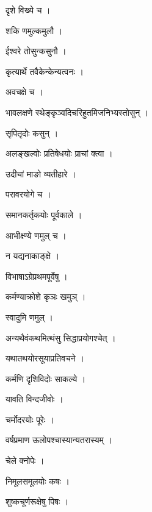 \documentclass[10pt, openany, oneside]{book}
\begin{document}
\noindent दृशे विख्ये च ।

\noindent शकि णमुल्कमुलौ ।

\noindent ईश्वरे तोसुन्कसुनौ ।

\noindent कृत्यार्थे तवैकेन्केन्यत्वनः ।

\noindent अवचक्षे च ।

\noindent भावलक्षणे स्थेङ्कृञ्वदिचरिहुतमिजनिभ्यस्तोसुन् ।

\noindent सृपितृदोः कसुन् ।

\noindent अलङ्खल्वोः प्रतिषेधयोः प्राचां क्त्वा ।

\noindent उदीचां माङो व्यतीहारे ।

\noindent परावरयोगे च ।

\noindent समानकर्तृकयोः पूर्वकाले ।

\noindent आभीक्ष्ण्ये णमुल् च ।

\noindent न यद्यनाकाङ्क्षे ।

\noindent विभाषाऽग्रेप्रथमपूर्वेषु ।

\noindent कर्मण्याक्रोशे कृञः खमुञ् ।

\noindent स्वादुमि णमुल् ।

\noindent अन्यथैवंकथमित्थंसु सिद्धाप्रयोगश्चेत् ।

\noindent यथातथयोरसूयाप्रतिवचने ।

\noindent कर्मणि दृशिविदोः साकल्ये ।

\noindent यावति विन्दजीवोः ।

\noindent चर्मोदरयोः पूरेः ।

\noindent वर्षप्रमाण ऊलोपश्चास्यान्यतरास्यम् ।

\noindent चेले क्नोपेः ।

\noindent निमूलसमूलयोः कषः ।

\noindent शुष्कचूर्णरूक्षेषु पिषः ।
\end{document}
